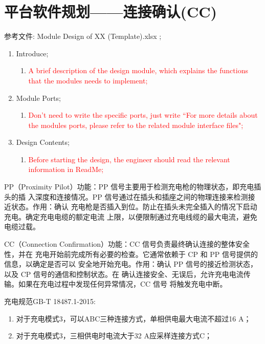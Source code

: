 
\chapter{平台软件规划——连接确认(CC)}

 参考文件: Module Design of XX (Template).xlsx \cite{MDOT1};   
  
 \begin{enumerate}[label=\textbullet]
	\item  Introduce;
        \begin{enumerate}[label={}]
            \item \textcolor{red}{A brief description of the design module, which explains the functions that the modules needs to implement;}
        \end{enumerate}
	\item  Module Ports;
        \begin{enumerate}[label={}]
            \item \textcolor{red}{Don't need to write the specific ports, just write ``For more details about the modules ports, please refer to the related module interface files";}
        \end{enumerate}
	\item  Design Contents;
        \begin{enumerate}[label={}]
            \item \textcolor{red}{Before starting the design, the engineer should read the relevant information in ReadMe;}
        \end{enumerate}
\end{enumerate}

PP（Proximity Pilot）功能：PP 信号主要用于检测充电枪的物理状态，即充电插头的插
入深度和连接情况。PP 信号通过在插头和插座之间的物理连接来检测接近状态。作用：确认
充电枪是否插入到位。防止在插头未完全插入的情况下启动充电。确定充电电缆的额定电流
上限，以便限制通过充电线缆的最大电流，避免电缆过载。

CC（Connection Confirmation）功能：CC 信号负责最终确认连接的整体安全性，并在
充电开始前完成所有必要的检查。它通常依赖于 CP 和 PP 信号提供的信息，以确定是否可以
安全地开始充电。作用：确认 PP 信号的接近检测状态，以及 CP 信号的通信和控制状态。在
确认连接安全、无误后，允许充电电流传输。如果在充电过程中发现任何异常情况，CC 信号
将触发充电中断。

充电规范GB-T 18487.1-2015\cite{GB18487_1}:
    \begin{enumerate}
        \item 对于充电模式3，可以ABC三种连接方式，单相供电最大电流不超过16 A；
        \item 对于充电模式3，三相供电时电流大于32 A应采样连接方式C；
    \end{enumerate}

